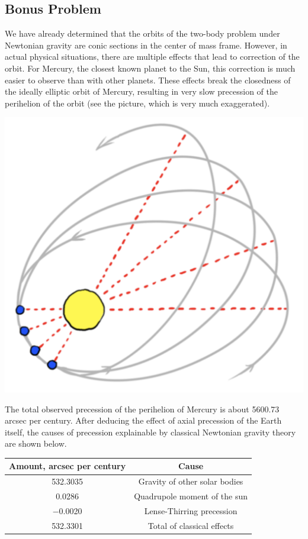 \documentclass[../psets.tex]{subfiles}
\begin{document}
\subsection*{Bonus Problem}
We have already determined that the orbits of the two-body problem under Newtonian gravity are conic sections in the center of mass frame. However, in actual physical situations, there are multiple effects that lead to correction of the orbit. For Mercury, the closest known planet to the Sun, this correction is much easier to observe than with other planets. These effects break the closedness of the ideally elliptic orbit of Mercury, resulting in very slow precession of the perihelion of the orbit (see the picture, which is very much exaggerated).
\begin{center}
    \includegraphics[width=0.4\linewidth]{../ExtFiles/mercuryPrecession.png}
\end{center}
The total observed precession of the perihelion of Mercury is about \num{5600.73} arcsec per century. After deducing the effect of axial precession of the Earth itself, the causes of precession explainable by classical Newtonian gravity theory are shown below.
\begin{center}
    \small
    \renewcommand{\arraystretch}{1.2}
    \begin{tabular}{cc}
        \toprule
        Amount, arcsec per century & Cause\\
        \midrule
        \num{532.3035} & Gravity of other solar bodies\\
        \num{0.0286} & Quadrupole moment of the sun\\
        \num{-0.0020} & Lense-Thirring precession\\
        \num{532.3301} & Total of classical effects\\
        \bottomrule
    \end{tabular}
\end{center}
\end{document}
